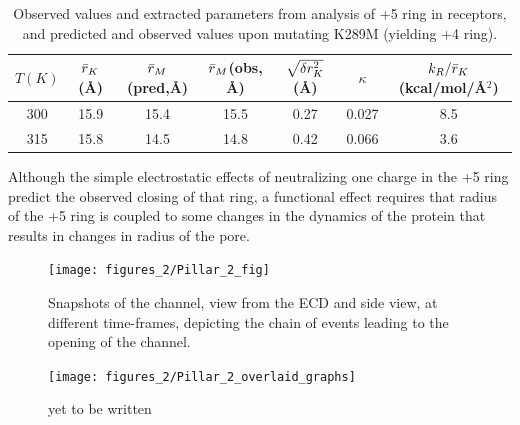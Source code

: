 \documentclass[9pt,twocolumn,twoside,lineno]{pnas-new}
\begin{document}
\begin{table}[htp]
\caption{\label{tab:prediction} Observed values and extracted parameters from analysis of +5 ring in \WT receptors, and predicted and observed values upon mutating K289M (yielding +4 ring).}
\begin{center}
\begin{adjustbox}{width=0.5\textwidth}
\small
\begin{tabular}{|c|c|c|c|c|c|c|}
$T (K) $& $\bar{r}_{K} $(\AA) &$\bar{r}_{M}$(pred,\AA)&  $\bar{r}_{M}$(obs, \AA)& $ \sqrt{\delta r^{2}_{K}} $ (\AA)& $\kappa$ & $k_{R}/\bar{r}_{K}$ (kcal/mol/\AA$^{2}$)\\
\hline
300 & 15.9 & 15.4 &  15.5 & 0.27 &  0.027&8.5 \\
315 & 15.8 &   14.5&  14.8& 0.42 &  0.066 &3.6
\end{tabular}
\end{adjustbox}
\end{center}
\label{default}
\end{table}%
Although the simple electrostatic effects of neutralizing one charge in the +5 ring predict the observed closing of that ring, a functional effect requires that radius of the +5 ring is coupled to some changes in the dynamics of the protein that results in changes in radius of the pore. 
\begin{figure}
\begin{center}
\texttt{[image: figures\_2/Pillar\_2\_fig]}
\end{center}
\caption{Snapshots of the channel, view from the ECD and side view,  at different time-frames, depicting the chain of events leading to the opening of the channel.}
\label{fig:Pillar_2_fig}
\end{figure}

\begin{figure}
\begin{center}
\texttt{[image: figures\_2/Pillar\_2\_overlaid\_graphs]}
\end{center}
\caption{yet to be written}
\label{fig:Pillar_2_graphs}
\end{figure}
\end{document}

